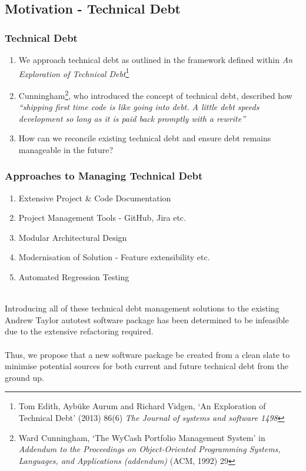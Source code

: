 \documentclass[xcolor]{beamer}
\begin{document}
\subsection{Motivation - Technical Debt}
\begin{frame}
	\frametitle{Technical Debt}
	\begin{enumerate}
		\setlength\itemsep{1em}
		\item We approach technical debt as outlined in the framework defined within \textit{An Exploration of Technical Debt}\footnote{Tom Edith, Aybüke Aurum and Richard Vidgen, ‘An Exploration of Technical Debt’ (2013) 86(6) \textit{The Journal of systems and software 1498}}
			\pause
		\item Cunningham\footnote{Ward Cunningham, ‘The WyCash Portfolio Management System’ in \textit{Addendum to the Proceedings on Object-Oriented Programming Systems, Languages, and Applications (addendum)} (ACM, 1992) 29}, who introduced the concept of technical debt, described how \textit{“shipping first time code is like going into debt. A little debt speeds development so long as it is paid back promptly with a rewrite”}
			\pause
		\item How can we reconcile existing technical debt and ensure debt remains manageable in the future?
	\end{enumerate}
\end{frame}
\begin{frame}
	\frametitle{Approaches to Managing Technical Debt}
	\begin{enumerate}
		\setlength\itemsep{0.5em}
		\item Extensive Project \& Code Documentation
			\pause
		\item Project Management Tools - GitHub, Jira etc.
			\pause
		\item Modular Architectural Design
			\pause
		\item Modernisation of Solution - Feature extensibility etc.
			\pause
		\item Automated Regression Testing
			\pause
	\end{enumerate}
	~\\
	Introducing all of these technical debt management solutions to the existing Andrew Taylor autotest software package has been determined to be infeasible due to the extensive refactoring required.
	\\~\\
	Thus, we propose that a new software package be created from a clean slate to minimise potential sources for both current and future technical debt from the ground up.
\end{frame}
\end{document}
